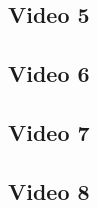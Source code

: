 \documentclass{article}
\begin{document}
\subsection{Video 5}
\subsection{Video 6}




\subsection{Video 7}







\subsection{Video 8}


 
\end{document}
